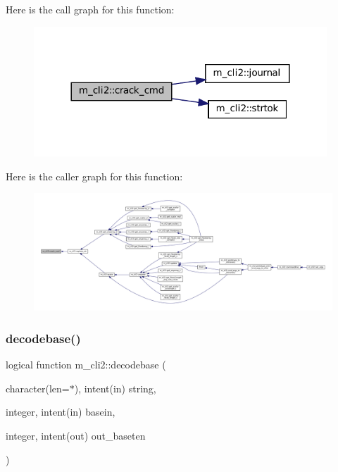Here is the call graph for this function\+:\nopagebreak
\begin{figure}[H]
\begin{center}
\leavevmode
\includegraphics[width=312pt]{namespacem__cli2_a710b26995119aee101959555b1bac8e2_cgraph}
\end{center}
\end{figure}
Here is the caller graph for this function\+:\nopagebreak
\begin{figure}[H]
\begin{center}
\leavevmode
\includegraphics[width=350pt]{namespacem__cli2_a710b26995119aee101959555b1bac8e2_icgraph}
\end{center}
\end{figure}
\mbox{\label{namespacem__cli2_a1029304d495b2bf791e03cfab5983bbb}} 
\subsubsection{\texorpdfstring{decodebase()}{decodebase()}}
{\footnotesize\ttfamily logical function m\+\_\+cli2\+::decodebase (\begin{DoxyParamCaption}\item[{character(len=$\ast$), intent(in)}]{string,  }\item[{integer, intent(in)}]{basein,  }\item[{integer, intent(out)}]{out\+\_\+baseten }\end{DoxyParamCaption})\hspace{0.3cm}{\ttfamily [private]}}



